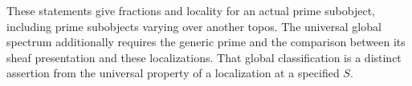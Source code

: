 These statements give fractions and locality for an actual prime
subobject, including prime subobjects varying over another topos.
The universal global spectrum additionally requires the generic prime
and the comparison between its sheaf presentation and these
localizations. That global classification is a distinct assertion
from the universal property of a localization at a specified \(S\).
